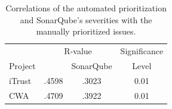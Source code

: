 \begin{table}
    \caption{Correlations of the automated prioritization and SonarQube's severities with the manually prioritized issues.}
    \label{tab:correlations}
    \centering
    \begin{tabular}{l|cc|c}
        \toprule
        & \multicolumn{2}{c|}{R-value} & Significance\\
        Project & \appr{} & SonarQube & Level \\
         \midrule
        iTrust & .4598 & .3023 & 0.01 \\
        CWA & .4709 & .3922 & 0.01 \\
         \bottomrule
    \end{tabular}
    \vspace{-14pt}
\end{table}


